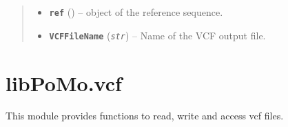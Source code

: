 \documentclass[letterpaper,10pt,english]{sphinxmanual}
\begin{document}
\begin{fulllineitems}
\begin{quote}
\begin{description}
\begin{itemize}
\item {} 
\textbf{\texttt{ref}} ({\hyperref[seqbase:libPoMo.seqbase.Seq]{}}) -- {\hyperref[seqbase:libPoMo.seqbase.Seq]{}} object of the
reference sequence.

\item {} 
\textbf{\texttt{VCFFileName}} (\emph{\texttt{str}}) -- Name of the VCF output file.

\end{itemize}

\end{description}\end{quote}

\end{fulllineitems}

\label{vcf:module-libPoMo.vcf}

\section{libPoMo.vcf}
\label{vcf::doc}\label{vcf:libpomo-vcf}
This module provides functions to read, write and access vcf files.
\end{document}
